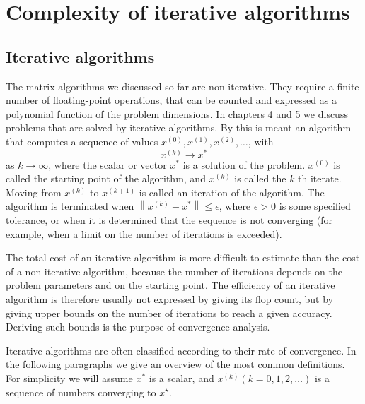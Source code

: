 \chapter{Complexity of iterative algorithms}

\section{Iterative algorithms}

The matrix algorithms we discussed so far are non-iterative. They require a finite number of floating-point operations, that can be counted and expressed as a polynomial function of the problem dimensions. In chapters 4 and 5 we discuss problems that are solved by iterative algorithms. By this is meant an algorithm that computes a sequence of values $ x^{(0)}, x^{(1)}, x^{(2)}, \ldots $, with
$$
x^{(k)} \rightarrow x^{*}
$$
as $ k \rightarrow \infty $, where the scalar or vector $ x^{*} $ is a solution of the problem. $ x^{(0)} $ is called the starting point of the algorithm, and $ x^{(k)} $ is called the $ k $ th iterate. Moving from $ x^{(k)} $ to $ x^{(k+1)} $ is called an iteration of the algorithm. The algorithm is terminated when $ \left\|x^{(k)}-x^{*}\right\| \leq \epsilon $, where $ \epsilon>0 $ is some specified tolerance, or when it is determined that the sequence is not converging (for example, when a limit on the number of iterations is exceeded).

The total cost of an iterative algorithm is more difficult to estimate than the cost of a non-iterative algorithm, because the number of iterations depends on the problem parameters and on the starting point. The efficiency of an iterative algorithm is therefore usually not expressed by giving its flop count, but by giving upper bounds on the number of iterations to reach a given accuracy. Deriving such bounds is the purpose of convergence analysis.

Iterative algorithms are often classified according to their rate of convergence. In the following paragraphs we give an overview of the most common definitions. For simplicity we will assume $ x^{*} $ is a scalar, and $ x^{(k)}(k=0,1,2, \ldots) $ is a sequence of numbers converging to $ x^{\star} $.

